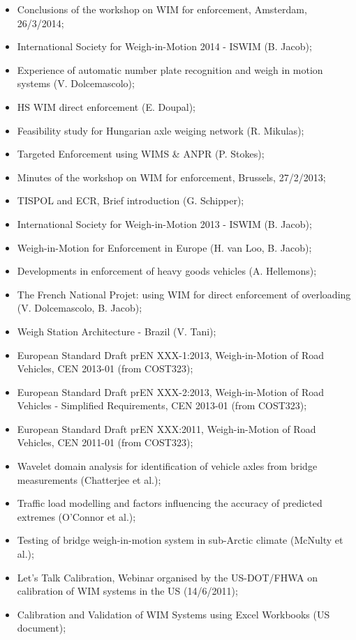 \documentclass{ufscThesis}
\begin{document}
\begin{itemize}
\item Conclusions of the workshop on WIM for enforcement, Amsterdam, 26/3/2014;
\item International Society for Weigh-in-Motion 2014 - ISWIM (B. Jacob);
\item Experience of automatic number plate recognition and weigh in motion systems (V. Dolcemascolo);
\item HS WIM direct enforcement (E. Doupal);
\item Feasibility study for Hungarian axle weiging network (R. Mikulas);
\item Targeted Enforcement using WIMS \& ANPR (P. Stokes);
\item Minutes of the workshop on WIM for enforcement, Brussels, 27/2/2013;
\item TISPOL and ECR, Brief introduction (G. Schipper);
\item International Society for Weigh-in-Motion 2013 - ISWIM (B. Jacob);
\item Weigh-in-Motion for Enforcement in Europe (H. van Loo, B. Jacob);
\item Developments in enforcement of heavy goods vehicles (A. Hellemons);
\item The French National Projet: using WIM for direct enforcement of overloading (V. Dolcemascolo, B. Jacob);
\item Weigh Station Architecture - Brazil (V. Tani);
\item European Standard Draft prEN XXX-1:2013, Weigh-in-Motion of Road Vehicles, CEN 2013-01 (from COST323);
\item European Standard Draft prEN XXX-2:2013, Weigh-in-Motion of Road Vehicles - Simplified Requirements, CEN 2013-01 (from COST323);
\item European Standard Draft prEN XXX:2011, Weigh-in-Motion of Road Vehicles, CEN 2011-01 (from COST323);
\item Wavelet domain analysis for identification of vehicle axles from bridge measurements (Chatterjee et al.);
\item Traffic load modelling and factors influencing the accuracy of predicted extremes (O'Connor et al.);
\item Testing of bridge weigh-in-motion system in sub-Arctic climate (McNulty et al.);
\item Let's Talk Calibration, Webinar organised by the US-DOT/FHWA on calibration of WIM systems in the US (14/6/2011);
\item Calibration and Validation of WIM Systems using Excel Workbooks (US document);

\end{itemize}
\end{document}
